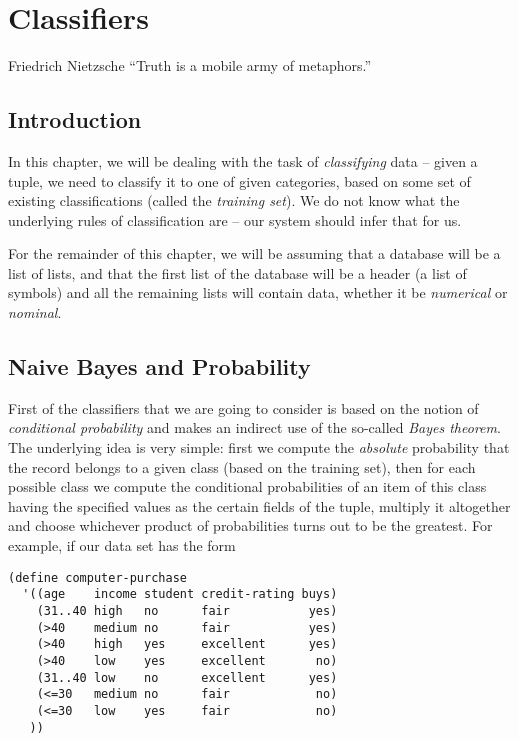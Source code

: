 \chapter{Classifiers}

\begin{chapquote}{Friedrich Nietzsche}
``Truth is a mobile army of metaphors.''
\end{chapquote}

\section{Introduction}

In this chapter, we will be dealing with the task of
\textit{classifying} data -- given a tuple, we need
to classify it to one of given categories, based
on some set of existing classifications (called the
\textit{training set}). We do not know what the
underlying rules of classification are -- our system
should infer that for us.

For the remainder of this chapter, we will be assuming
that a database will be a list of lists, and that
the first list of the database will be a header
(a list of symbols) and all the remaining lists
will contain data, whether it be \textit{numerical} or
\textit{nominal}.

\section{Naive Bayes and Probability}

First of the classifiers that we are going to consider
is based on the notion of \textit{conditional probability}
and makes an indirect use of the so-called
\textit{Bayes theorem}. The underlying idea is very simple:
first we compute the \textit{absolute} probability that
the record belongs to a given class (based on the training
set), then for each possible class we compute the conditional
probabilities of an item of this class having the specified
values as the certain fields of the tuple, multiply it
altogether and choose whichever product of probabilities
turns out to be the greatest. For example, if our data
set has the form

\begin{Verbatim}
(define computer-purchase
  '((age    income student credit-rating buys)
    (31..40 high   no      fair           yes)
    (>40    medium no      fair           yes)
    (>40    high   yes     excellent      yes)
    (>40    low    yes     excellent       no)
    (31..40 low    no      excellent      yes)
    (<=30   medium no      fair            no)
    (<=30   low    yes     fair            no)
   ))
\end{Verbatim}

